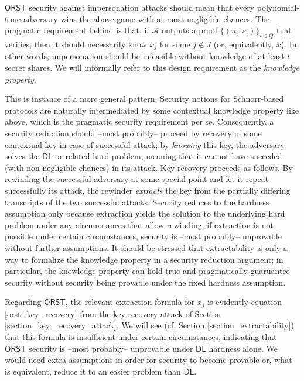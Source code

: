 \documentclass[psamsfonts, reqno]{amsart}
\theoremstyle{definition}
\theoremstyle{remark}
\numberwithin{equation}{section}
\begin{document}
$\mathsf{ORST}$ security against impersonation attacks should mean
that every polynomial-time adversary wins the above game
with at most negligible chances.
The pragmatic requirement behind is that,
if $\mathcal{A}$ outputs a proof
$\{(u_i, s_i)\}_{i \in Q}$ that verifies,
then it should necessarily know $x_j$ for some $j \not \in J$
(or, equivalently, $x$). In other words,
impersonation should be infeasible
without knowledge of at least $t$ secret shares.
We will informally refer to this design requirement
as the \textit{knowledge property}.

This is instance of a more general pattern.
Security notions for Schnorr-based protocols
are naturally intermediated by some
contextual knowledge property like above,
which is the pragmatic security requirement per se.
Consequently,
a security reduction should --most probably--
proceed by recovery
of some contextual key in case of successful attack;
by \textit{knowing} this key, the adversary solves
the $\mathsf{DL}$ or related hard problem,
meaning that it cannot have succeded
(with non-negligible chances) in its attack.
Key-recovery proceeds as follows.
By rewinding the successful adversary
at some special point and let it repeat
successfully its attack,
the rewinder \textit{extracts} the key
from the partially differing transcripts
of the two successful attacks.
Security reduces to the hardness assumption only because
extraction yields the solution to the underlying hard problem
under any circumstances that allow rewinding;
if extraction is not possible under certain circumstances,
security is --most probably--
unprovable without further assumptions.
It should be stressed that extractability
is only a way to formalize
the knowledge property in a security reduction argument;
in particular, the knowledge property
can hold true and pragmatically
guaruantee security without security being provable
under the fixed hardness assumption.

Regarding $\mathsf{ORST}$,
the relevant extraction formula for $x_j$
is evidently equation \eqref{orst_key_recovery}
from the key-recovery attack
of Section \ref{section_key_recovery_attack}.
We will see
(cf. Section \ref{section_extractability})
that this formula is insufficient
under certain circumstances,
indicating that $\mathsf{ORST}$ security
is --most probably-- unprovable
under $\mathsf{DL}$ hardness alone.
We would need extra assumptions in order
for security to become provable
or, what is equivalent,
reduce it to an easier problem than $\mathsf{DL}$.
\end{document}
